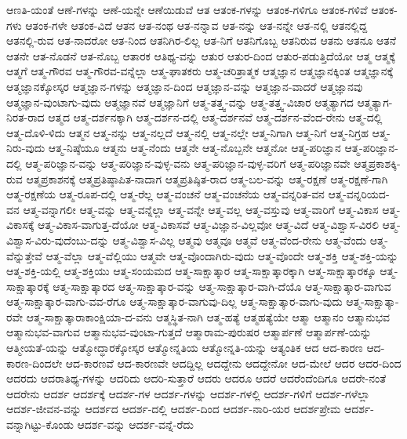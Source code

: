 {ಆಣತಿ-ಯಂತೆ
ಆಣೆ-ಗಳನ್ನು
ಆಣೆ-ಯನ್ನೇ
ಆಣೆಯಿಡುವೆ
ಆತ
ಆತಂಕ-ಗಳನ್ನು
ಆತಂಕ-ಗಳಿಗೂ
ಆತಂಕ-ಗಳಿವೆ
ಆತಂಕ-ಗಳು
ಆತಂಕ-ಗಳೇ
ಆತಂಕ-ವಿದೆ
ಆತನ
ಆತ-ನಂಥ
ಆತ-ನನ್ನಾವ
ಆತ-ನನ್ನು
ಆತ-ನನ್ನೇ
ಆತ-ನಲ್ಲಿ
ಆತನಲ್ಲಿದ್ದ
ಆತನಲ್ಲಿ-ರುವ
ಆತ-ನಾದರೋ
ಆತ-ನಿಂದ
ಆತನಿಗಿರ-ಲಿಲ್ಲ
ಆತ-ನಿಗೆ
ಆತನಿಗೊಬ್ಬ
ಆತನಿರುವ
ಆತನು
ಆತನೂ
ಆತನೆ
ಆತನೇ
ಆತ-ನೊಡನೆ
ಆತ-ನೊಬ್ಬ
ಆತಾರಕ
ಆತಿಥ್ಯ-ವನ್ನು
ಆತುರ
ಆತುರ-ದಿಂದ
ಆತುರ-ಪಡುತ್ತಿದೆಯೋ
ಆತ್ಮ
ಆತ್ಮಕ್ಕೆ
ಆತ್ಮಗೆ
ಆತ್ಮ-ಗೌರವ
ಆತ್ಮ-ಗೌರವ-ವನ್ನೆಲ್ಲಾ
ಆತ್ಮ-ಘಾತಕರು
ಆತ್ಮ-ಚರಿತ್ರಾತ್ಮಕ
ಆತ್ಮಜ್ಞಾನ
ಆತ್ಮಜ್ಞಾನಕ್ಕಿಂತ
ಆತ್ಮಜ್ಞಾನಕ್ಕೆ
ಆತ್ಮಜ್ಞಾನಕ್ಕೋಸ್ಕರ
ಆತ್ಮಜ್ಞಾನ-ಗಳನ್ನು
ಆತ್ಮಜ್ಞಾನ-ದಿಂದ
ಆತ್ಮಜ್ಞಾನ-ವನ್ನು
ಆತ್ಮಜ್ಞಾನ-ವಾದರೆ
ಆತ್ಮಜ್ಞಾನವು
ಆತ್ಮಜ್ಞಾನ-ವುಂಟಾಗು-ವುದು
ಆತ್ಮಜ್ಞಾನವೆ
ಆತ್ಮಜ್ಞಾನಿಗೆ
ಆತ್ಮ-ತತ್ತ್ವ-ವನ್ನು
ಆತ್ಮ-ತತ್ತ್ವ-ವಿಚಾರ
ಆತ್ಮತ್ಯಾಗದ
ಆತ್ಮತ್ಯಾಗ-ನಿರತ-ರಾದ
ಆತ್ಮದ
ಆತ್ಮ-ದರ್ಶನಕ್ಕಾಗಿ
ಆತ್ಮ-ದರ್ಶನ-ದಲ್ಲಿ
ಆತ್ಮ-ದರ್ಶನವೆ
ಆತ್ಮ-ದರ್ಶನ-ವೆಂದ-ರೇನು
ಆತ್ಮ-ದಲ್ಲಿ
ಆತ್ಮ-ದೊಳಿ-ಳಿದು
ಆತ್ಮನ
ಆತ್ಮ-ನನ್ನು
ಆತ್ಮ-ನಲ್ಲದೆ
ಆತ್ಮ-ನಲ್ಲಿ
ಆತ್ಮ-ನಲ್ಲೇ
ಆತ್ಮ-ನಿಗಾಗಿ
ಆತ್ಮ-ನಿಗೆ
ಆತ್ಮ-ನಿಗ್ರಹ
ಆತ್ಮ-ನಿರು-ವುದು
ಆತ್ಮ-ನಿಷ್ಠೆಯೂ
ಆತ್ಮನು
ಆತ್ಮ-ನೆಂದು
ಆತ್ಮನೇ
ಆತ್ಮ-ನೊಬ್ಬನೇ
ಆತ್ಮನೋ
ಆತ್ಮ-ಪರಿಜ್ಞಾನ
ಆತ್ಮ-ಪರಿಜ್ಞಾನ-ದಲ್ಲಿ
ಆತ್ಮ-ಪರಿಜ್ಞಾನ-ವನ್ನು
ಆತ್ಮ-ಪರಿಜ್ಞಾನ-ವುಳ್ಳ-ವನು
ಆತ್ಮ-ಪರಿಜ್ಞಾನ-ವುಳ್ಳ-ವರಿಗೆ
ಆತ್ಮ-ಪರಿಜ್ಞಾನವೇ
ಆತ್ಮಪ್ರಕಾಶಕ್ಕಿ-ರುವ
ಆತ್ಮಪ್ರಕಾಶನಕ್ಕೆ
ಆತ್ಮಪ್ರತಿಷ್ಠಾಪಿತ-ನಾದಾಗ
ಆತ್ಮಪ್ರತಿಷ್ಠಿತ-ರಾದ
ಆತ್ಮ-ಬಲ-ವನ್ನು
ಆತ್ಮ-ರಕ್ಷಣೆ
ಆತ್ಮ-ರಕ್ಷಣೆ-ಗಾಗಿ
ಆತ್ಮ-ರಕ್ಷಣೆಯ
ಆತ್ಮ-ರೂಪ-ದಲ್ಲಿ
ಆತ್ಮ-ರೆಲ್ಲ
ಆತ್ಮ-ವಂಚನೆ
ಆತ್ಮ-ವಂಚನೆಯ
ಆತ್ಮ-ವನ್ನರಿತ-ವನ
ಆತ್ಮ-ವನ್ನರಿಯದ-ವನ
ಆತ್ಮ-ವನ್ನಾಗಲೀ
ಆತ್ಮ-ವನ್ನು
ಆತ್ಮ-ವನ್ನೆಲ್ಲಾ
ಆತ್ಮ-ವನ್ನೇ
ಆತ್ಮ-ವಲ್ಲ
ಆತ್ಮ-ವಸ್ತುವು
ಆತ್ಮ-ವಾರಿಗೆ
ಆತ್ಮ-ವಿಕಾಸ
ಆತ್ಮ-ವಿಕಾಸಕ್ಕೆ
ಆತ್ಮ-ವಿಕಾಸ-ವಾಗುತ್ತ-ದೆಯೋ
ಆತ್ಮ-ವಿಕಾಸವೆ
ಆತ್ಮ-ವಿಜ್ಞಾನ-ವಿಲ್ಲವೋ
ಆತ್ಮ-ವಿದೆ
ಆತ್ಮ-ವಿಶ್ವಾಸ-ವಿರಲಿ
ಆತ್ಮ-ವಿಶ್ವಾಸ-ವಿರು-ವುದೆಂಬು-ದನ್ನು
ಆತ್ಮ-ವಿಶ್ವಾಸ-ವಿಲ್ಲ
ಆತ್ಮವು
ಆತ್ಮವೂ
ಆತ್ಮವೆ
ಆತ್ಮ-ವೆಂದ-ರೇನು
ಆತ್ಮ-ವೆಂದು
ಆತ್ಮ-ವೆನ್ನುತ್ತೇವೆ
ಆತ್ಮ-ವೆಲ್ಲಾ
ಆತ್ಮ-ವೆಲ್ಲಿಯು
ಆತ್ಮವೇ
ಆತ್ಮ-ವೊಂದಾಗಿರು-ವುದು
ಆತ್ಮ-ವೊಂದೇ
ಆತ್ಮ-ಶಕ್ತಿ
ಆತ್ಮ-ಶಕ್ತಿ-ಯನ್ನು
ಆತ್ಮ-ಶಕ್ತಿ-ಯಲ್ಲಿ
ಆತ್ಮ-ಶಕ್ತಿಯು
ಆತ್ಮ-ಸಂಯಮದ
ಆತ್ಮ-ಸಾಕ್ಷಾತ್ಕಾರ
ಆತ್ಮ-ಸಾಕ್ಷಾತ್ಕಾರಕ್ಕಾಗಿ
ಆತ್ಮ-ಸಾಕ್ಷಾತ್ಕಾರಕ್ಕೂ
ಆತ್ಮ-ಸಾಕ್ಷಾತ್ಕಾರಕ್ಕೆ
ಆತ್ಮ-ಸಾಕ್ಷಾತ್ಕಾರದ
ಆತ್ಮ-ಸಾಕ್ಷಾತ್ಕಾರ-ವನ್ನು
ಆತ್ಮ-ಸಾಕ್ಷಾತ್ಕಾರ-ವಾಗಿ-ದೆಯೊ
ಆತ್ಮ-ಸಾಕ್ಷಾತ್ಕಾರ-ವಾಗುವ
ಆತ್ಮ-ಸಾಕ್ಷಾತ್ಕಾರ-ವಾಗು-ವವ-ರೆಗೂ
ಆತ್ಮ-ಸಾಕ್ಷಾತ್ಕಾರ-ವಾಗುವು-ದಿಲ್ಲ
ಆತ್ಮ-ಸಾಕ್ಷಾತ್ಕಾರ-ವಾಗು-ವುದು
ಆತ್ಮ-ಸಾಕ್ಷಾತ್ಕಾ-ರವೇ
ಆತ್ಮ-ಸಾಕ್ಷಾತ್ಕಾರಾಕಾಂಕ್ಷಿಯಾ-ದ-ವನು
ಆತ್ಮಸ್ಥಿತ-ನಾಗಿ
ಆತ್ಮ-ಹತ್ಯೆ
ಆತ್ಮಹತ್ಯೆಯೇ
ಆತ್ಮಾ
ಆತ್ಮಾನಂ
ಆತ್ಮಾನುಭವ
ಆತ್ಮಾನುಭವ-ವಾಗುವ
ಆತ್ಮಾನುಭವ-ವುಂಟಾ-ಗುತ್ತದೆ
ಆತ್ಮಾರಾಮ-ಪುರುಷರ
ಆತ್ಮಾರ್ಪಣೆ
ಆತ್ಮಾರ್ಪಣೆ-ಯನ್ನು
ಆತ್ಮೀಯತೆ-ಯನ್ನು
ಆತ್ಮೋದ್ಧಾರಕ್ಕೋಸ್ಕರ
ಆತ್ಮೋನ್ನತಿಯ
ಆತ್ಮೋನ್ನತಿ-ಯನ್ನು
ಆತ್ಯಂತಿಕ
ಆದ
ಆದ-ಕಾರಣ
ಆದ-ಕಾರಣ-ದಿಂದಲೇ
ಆದ-ಕಾರಣವೆ
ಆದ-ಕಾರಣವೇ
ಆದದ್ದಿಲ್ಲ
ಆದದ್ದೇನು
ಆದದ್ದೇನೋ
ಆದ-ಮೇಲೆ
ಆದರ
ಆದರ-ದಿಂದ
ಆದರದು
ಆದರಾತಿಥ್ಯ-ಗಳನ್ನು
ಆದರಿದು
ಆದರಿ-ಸುತ್ತಾರೆ
ಆದರು
ಆದರೂ
ಆದರೆ
ಆದರೆಂದೆಂದಿಗೂ
ಆದರೇ-ನಂತೆ
ಆದರೇನು
ಆದರ್ಶ
ಆದರ್ಶಕ್ಕೆ
ಆದರ್ಶ-ಗಳ
ಆದರ್ಶ-ಗಳನ್ನು
ಆದರ್ಶ-ಗಳಲ್ಲಿ
ಆದರ್ಶ-ಗಳಿಗೆ
ಆದರ್ಶ-ಗಳೆಲ್ಲಾ
ಆದರ್ಶ-ಜೀವನ-ವನ್ನು
ಆದರ್ಶದ
ಆದರ್ಶ-ದಲ್ಲಿ
ಆದರ್ಶ-ದಿಂದ
ಆದರ್ಶ-ನಾರಿ-ಯರ
ಆದರ್ಶಪ್ರೇಮ
ಆದರ್ಶ-ವನ್ನಾಗಿಟ್ಟು-ಕೊಂಡು
ಆದರ್ಶ-ವನ್ನು
ಆದರ್ಶ-ವನ್ನೆ-ರೆದು
}
